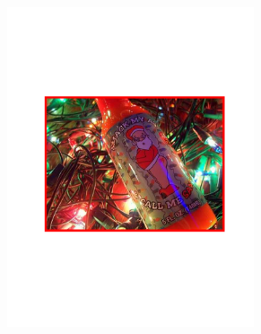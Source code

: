 \begin{figure}[hbt]
\begin{subfigure}[b]{0.37\textwidth}
        \includegraphics[width=0.8\textwidth]{FP2}
        \caption{}
        \label{fig:detfp2}
    \end{subfigure}
    

\end{figure}
